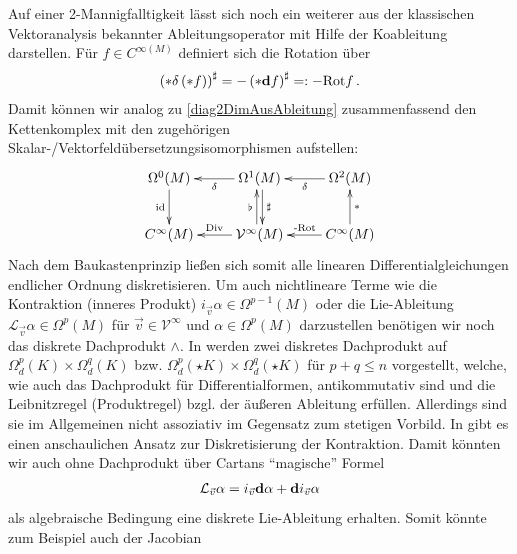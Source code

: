   \begin{fazit}
    Auf einer 2-Mannigfalltigkeit lässt sich noch ein weiterer aus der klassischen Vektoranalysis bekannter Ableitungsoperator mit Hilfe der Koableitung darstellen.
    Für \( f\in C^{\infty(M)} \) definiert sich die Rotation über
    \begin{align}
      \left( *\delta\left( *f \right) \right)^{\sharp} = -\left( *\mathbf{d} f \right)^{\sharp} =: -\text{Rot} f \,\text{.}
    \end{align}
    Damit können wir analog zu \eqref{diag2DimAusAbleitung} zusammenfassend den Kettenkomplex mit den zugehörigen Skalar-/Vektorfeldübersetzungsisomorphismen aufstellen:
    \begin{align}
      \begin{xy} \xymatrix{
        \Omega^{0}(M) \ar[d]_{\text{id}} & \Omega^{1}(M) \ar[l]^{\delta} \ar@<2pt>[d]^{\sharp} & \Omega^{2}(M) \ar[l]^{\delta}\\
        C^{\infty}(M) & \mathcal{V}^{\infty}(M) \ar[l]_{\text{Div}} \ar@<2pt>[u]^{\flat} & C^{\infty}(M) \ar[l]_{\text{-Rot}} \ar[u]_{*} }
      \end{xy}
    \end{align}
    Nach dem Baukastenprinzip ließen sich somit alle linearen Differentialgleichungen endlicher Ordnung diskretisieren.
    Um auch nichtlineare Terme wie die Kontraktion (inneres Produkt) \( i_{\vec{v}}\alpha\in\Omega^{p-1}(M) \) 
    oder die Lie-Ableitung \( \mathcal{L}_{\vec{v}}\alpha\in\Omega^{p}(M) \) für \( \vec{v}\in\mathcal{V}^{\infty} \) und \( \alpha\in\Omega^{p}(M) \) darzustellen
    benötigen wir noch das diskrete Dachprodukt \( \wedge \).
    In \cite{desbrun} werden zwei diskretes Dachprodukt auf \( \Omega_{d}^{p}(K)\times\Omega_{d}^{q}(K) \) bzw. \( \Omega_{d}^{p}(\star K)\times\Omega_{d}^{q}(\star K) \)
    für \( p+q\le n \) vorgestellt, welche, wie auch das Dachprodukt für Differentialformen, antikommutativ sind und die Leibnitzregel (Produktregel) bzgl. der äußeren Ableitung erfüllen.
    Allerdings sind sie im Allgemeinen nicht assoziativ im Gegensatz zum stetigen Vorbild.
    In \cite{diskreteLie} gibt es einen anschaulichen Ansatz zur Diskretisierung der Kontraktion.
    Damit könnten wir auch ohne Dachprodukt über Cartans "`magische"' Formel
    \begin{align}
      \mathcal{L}_{\vec{v}}\alpha = i_{\vec{v}}\mathbf{d}\alpha + \mathbf{d} i_{\vec{v}}\alpha 
    \end{align}
    als algebraische Bedingung eine diskrete Lie-Ableitung erhalten.
    Somit könnte zum Beispiel auch der Jacobian

\end{fazit}
